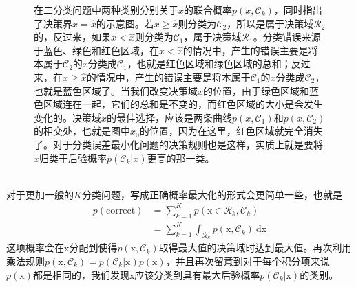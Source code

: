 \documentclass[b5paper]{book}
\numberwithin{equation}{chapter}
\begin{document}
{\begin{figure}[ht]
		\caption{在二分类问题中两种类别分别关于$x$的联合概率$p(x,\mathcal{C}_k)$，同时指出了决策界$x=\hat{x}$的示意图。若$x \geqslant \hat{x}$则分类为$\mathcal{C}_2$，所以是属于决策域$\mathcal{R}_2$的，反过来，如果$x < \hat{x}$则分类为$\mathcal{C}_1$，属于决策域$\mathcal{R}_1$。分类错误来源于蓝色、绿色和红色区域，在$x < \hat{x}$的情况中，产生的错误主要是将本属于$\mathcal{C}_2$的$x$分类成$\mathcal{C}_1$，也就是红色区域和绿色区域的总和；反过来，在$x \geqslant \hat{x}$的情况中，产生的错误主要是将本属于$\mathcal{C}_1$的$x$分类成$\mathcal{C}_2$，也就是蓝色区域了。当我们改变决策域$\hat{x}$的位置，由于绿色区域和蓝色区域连在一起，它们的总和是不变的，而红色区域的大小是会发生变化的。决策域$\hat{x}$的最佳选择，应该是两条曲线$p(x,\mathcal{C}_1)$和$p(x,\mathcal{C}_2)$的相交处，也就是图中$x_0$的位置，因为在这里，红色区域就完全消失了。对于分类误差最小化问题的决策规则也是这样，实质上就是要将$x$归类于后验概率$p(\mathcal{C}_k|x)$更高的那一类。}
		\label{fig:1-24}
	\end{figure}
	\\
	\indent 对于更加一般的$K$分类问题，写成正确概率最大化的形式会更简单一些，也就是
	\begin{equation}
		\begin{split}
			p(\mathrm{correct})&=\sum_{k=1}^{K}p(\boldsymbol{\mathrm{x}}\in \mathcal{R}_k,\mathcal{C}_k)\\
			&=\sum_{k=1}^{K}\int_{\mathcal{R}_k}p(\boldsymbol{\mathrm{x}},\mathcal{C}_k)\ \mathrm{d}\boldsymbol{\mathrm{x}}
		\end{split}	
	\end{equation}
	这项概率会在$\boldsymbol{\mathrm{x}}$分配到使得$p(\boldsymbol{\mathrm{x}},\mathcal{C}_k)$取得最大值的决策域时达到最大值。再次利用乘法规则$p(\boldsymbol{\mathrm{x}},\mathcal{C}_k)=p(\mathcal{C}_k|\boldsymbol{\mathrm{x}})p(\boldsymbol{\mathrm{x}})$，并且再次留意到对于每个积分项来说$p(\boldsymbol{\mathrm{x}})$都是相同的，我们发现$\boldsymbol{\mathrm{x}}$应该分类到具有最大后验概率$p(\mathcal{C}_k|\boldsymbol{\mathrm{x}})$的类别。
	}
\end{document}
